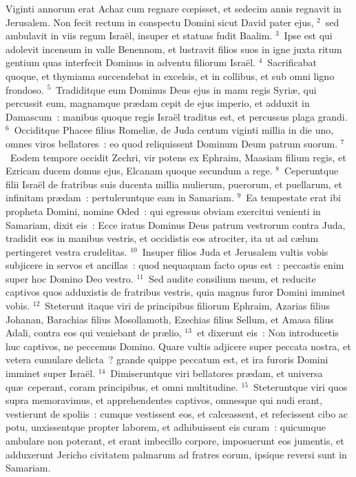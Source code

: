 \lettrine[lines=10,image=true,loversize=0.05,lraise=-0.03]{V}{}iginti annorum erat Achaz cum regnare cœpisset, et sedecim annis regnavit in Jerusalem. Non fecit rectum in conspectu Domini sicut David pater ejus,
${}^{2}$~sed ambulavit in viis regum Isra\"el, insuper et statuas fudit Baalim.
${}^{3}$~Ipse est qui adolevit incensum in valle Benennom, et lustravit filios suos in igne juxta ritum gentium quas interfecit Dominus in adventu filiorum Isra\"el.
${}^{4}$~Sacrificabat quoque, et thymiama succendebat in excelsis, et in collibus, et sub omni ligno frondoso.
${}^{5}$~Tradiditque eum Dominus Deus ejus in manu regis Syri\ae , qui percussit eum, magnamque pr\ae dam cepit de ejus imperio, et adduxit in Damascum~: manibus quoque regis Isra\"el traditus est, et percussus plaga grandi.
${}^{6}$~Occiditque Phacee filius Romeli\ae , de Juda centum viginti millia in die uno, omnes viros bellatores~: eo quod reliquissent Dominum Deum patrum suorum.
${}^{7}$~Eodem tempore occidit Zechri, vir potens ex Ephraim, Maasiam filium regis, et Ezricam ducem domus ejus, Elcanam quoque secundum a rege.
${}^{8}$~Ceperuntque filii Isra\"el de fratribus suis ducenta millia mulierum, puerorum, et puellarum, et infinitam pr\ae dam~: pertuleruntque eam in Samariam.
${}^{9}$~Ea tempestate erat ibi propheta Domini, nomine Oded~: qui egressus obviam exercitui venienti in Samariam, dixit eis~: Ecce iratus Dominus Deus patrum vestrorum contra Juda, tradidit eos in manibus vestris, et occidistis eos atrociter, ita ut ad c\ae lum pertingeret vestra crudelitas.
${}^{10}$~Insuper filios Juda et Jerusalem vultis vobis subjicere in servos et ancillas~: quod nequaquam facto opus est~: peccastis enim super hoc Domino Deo vestro.
${}^{11}$~Sed audite consilium meum, et reducite captivos quos adduxistis de fratribus vestris, quia magnus furor Domini imminet vobis.
${}^{12}$~Steterunt itaque viri de principibus filiorum Ephraim, Azarias filius Johanan, Barachias filius Mosollamoth, Ezechias filius Sellum, et Amasa filius Adali, contra eos qui veniebant de pr\ae lio,
${}^{13}$~et dixerunt eis~: Non introducetis huc captivos, ne peccemus Domino. Quare vultis adjicere super peccata nostra, et vetera cumulare delicta~? grande quippe peccatum est, et ira furoris Domini imminet super Isra\"el.
${}^{14}$~Dimiseruntque viri bellatores pr\ae dam, et universa qu\ae\ ceperant, coram principibus, et omni multitudine.
${}^{15}$~Steteruntque viri quos supra memoravimus, et apprehendentes captivos, omnesque qui nudi erant, vestierunt de spoliis~: cumque vestissent eos, et calceassent, et refecissent cibo ac potu, unxissentque propter laborem, et adhibuissent eis curam~: quicumque ambulare non poterant, et erant imbecillo corpore, imposuerunt eos jumentis, et adduxerunt Jericho civitatem palmarum ad fratres eorum, ipsique reversi sunt in Samariam.



